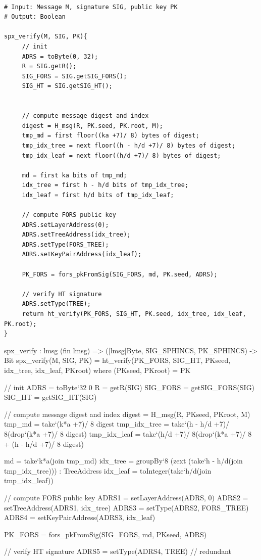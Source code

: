 \begin{lstlisting}[breaklines=true, label=alg:spx:ver, mathescape, language=pseudoc,
                   caption=\spxverify\ -- Verify a \spx signature \spxsig on a
   message \msg using a \spx public key \PK]
   
# Input: Message M, signature SIG, public key PK
# Output: Boolean

spx_verify(M, SIG, PK){
     // init
     ADRS = toByte(0, 32);
     R = SIG.getR();
     SIG_FORS = SIG.getSIG_FORS();
     SIG_HT = SIG.getSIG_HT();

     
     // compute message digest and index
     digest = H_msg(R, PK.seed, PK.root, M);
     tmp_md = first floor((ka +7)/ 8) bytes of digest;
     tmp_idx_tree = next floor((h - h/d +7)/ 8) bytes of digest;
     tmp_idx_leaf = next floor((h/d +7)/ 8) bytes of digest;
     
     md = first ka bits of tmp_md;
     idx_tree = first h - h/d bits of tmp_idx_tree;
     idx_leaf = first h/d bits of tmp_idx_leaf;

     // compute FORS public key
     ADRS.setLayerAddress(0);
     ADRS.setTreeAddress(idx_tree);
     ADRS.setType(FORS_TREE);
     ADRS.setKeyPairAddress(idx_leaf);
     
     PK_FORS = fors_pkFromSig(SIG_FORS, md, PK.seed, ADRS);
     
     // verify HT signature
     ADRS.setType(TREE);
     return ht_verify(PK_FORS, SIG_HT, PK.seed, idx_tree, idx_leaf, PK.root);
}
\end{lstlisting}

\begin{code}
  spx_verify : {lmsg} (fin lmsg) =>
    ([lmsg]Byte, SIG_SPHINCS, PK_SPHINCS) -> Bit 
  spx_verify(M, SIG, PK) =
    ht_verify(PK_FORS, SIG_HT, PKseed, idx_tree, idx_leaf, PKroot)
    where 
      (PKseed, PKroot) = PK

      // init
      ADRS = toByte`{32} 0
      R = getR(SIG)
      SIG_FORS = getSIG_FORS(SIG)
      SIG_HT = getSIG_HT(SIG)

      // compute message digest and index
      digest = H_msg(R, PKseed, PKroot, M)
      tmp_md =
        take`{(k*a +7)/ 8} digest
      tmp_idx_tree =
        take`{(h - h/d +7)/ 8}(drop`{(k*a +7)/ 8} digest)
      tmp_idx_leaf =
        take`{(h/d +7)/ 8}(drop`{(k*a +7)/ 8 + (h - h/d +7)/ 8} digest)

      md = take`{k*a}(join tmp_md)
      idx_tree =
        groupBy`{8} (zext (take`{h - h/d}(join tmp_idx_tree))) : TreeAddress
      idx_leaf = toInteger(take`{h/d}(join tmp_idx_leaf))

      // compute FORS public key
      ADRS1 = setLayerAddress(ADRS, 0)
      ADRS2 = setTreeAddress(ADRS1, idx_tree)
      ADRS3 = setType(ADRS2, FORS_TREE)
      ADRS4 = setKeyPairAddress(ADRS3, idx_leaf)

      PK_FORS = fors_pkFromSig(SIG_FORS, md, PKseed, ADRS)

      // verify HT signature
      ADRS5 = setType(ADRS4, TREE) // redundant
\end{code}

